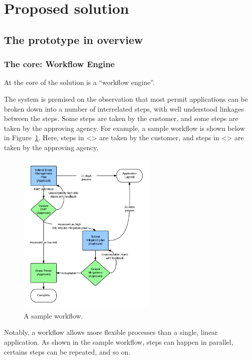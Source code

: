 \documentclass[12pt,a4paper,twosided]{article}
\begin{document}
\newpage
\section{Proposed solution}

\subsection{The prototype in overview}

\subsubsection{The core: Workflow Engine}

At the core of the solution is a ``workflow engine''.

The system is premised on the observation that most permit applications can be broken down into a number of interrelated steps, with well understood linkages between the steps. Some steps are taken by the customer, and some steps are taken by the approving agency. For example, a sample workflow is shown below in Figure~\ref{fig:sample-workflow}. Here, steps in <> are taken by the customer, and steps in <> are taken by the approving agency.

\begin{figure}[h!]
  \centering
  \includegraphics[width=0.6\textwidth]{sample-workflow.png}  
  \caption{A sample workflow.}
  \label{fig:sample-workflow}
\end{figure}

Notably, a workflow allows more flexible processes than a single, linear application. As shown in the sample workflow, steps can happen in parallel, certains steps can be repeated, and so on.
\end{document}

